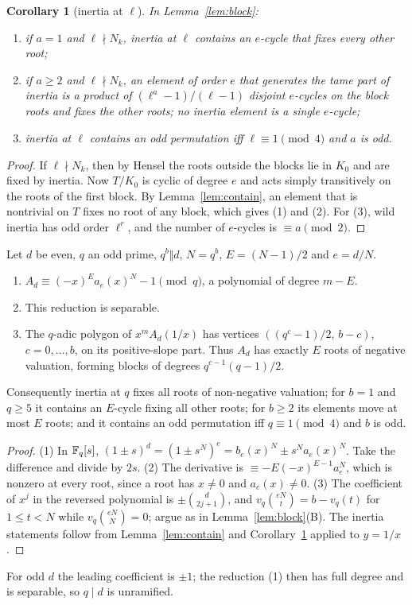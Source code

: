 \documentclass[11pt]{amsart}
\newtheorem{corollary}[theorem]{Corollary}\newtheorem{conjecture}[theorem]{Conjecture}
\theoremstyle{definition}\newtheorem{definition}[theorem]{Definition}\newtheorem{example}[theorem]{Example}
\theoremstyle{remark}\newtheorem{remark}[theorem]{Remark}
\begin{document}
\begin{corollary}[inertia at $\ell$]\label{cor:inertia}
In Lemma~\ref{lem:block}:
\begin{enumerate}
\item if $a=1$ and $\ell\nmid N_k$, inertia at $\ell$ contains an $e$-cycle that fixes every other root;
\item if $a\ge2$ and $\ell\nmid N_k$, an element of order $e$ that generates the tame part of inertia is a product of $(\ell^a-1)/(\ell-1)$ disjoint
$e$-cycles on the block roots and fixes the other roots; no inertia element is a single $e$-cycle;
\item inertia at $\ell$ contains an odd permutation iff $\ell\equiv1\pmod4$ and $a$ is odd.
\end{enumerate}
\end{corollary}
\begin{proof}
If $\ell\nmid N_k$, then by Hensel the roots outside the blocks lie in $K_0$ and are fixed by inertia. Now $T/K_0$ is cyclic of degree $e$ and
acts simply transitively on the roots of the first block. By Lemma~\ref{lem:contain}, an element that is nontrivial on $T$ fixes no root of any
block, which gives (1) and (2). For (3), wild inertia has odd order $\ell^r$, and the number of $e$-cycles is $\equiv a\pmod2$.
\end{proof}

\begin{lemma}\label{lem:dual}
Let $d$ be even, $q$ an odd prime, $q^b\Vert d$, $N=q^b$, $E=(N-1)/2$ and $e=d/N$.
\begin{enumerate}
\item $A_d\equiv(-x)^Ea_e(x)^N-1\pmod q$, a polynomial of degree $m-E$.
\item This reduction is separable.
\item The $q$-adic polygon of $x^mA_d(1/x)$ has vertices $((q^c-1)/2,\,b-c)$, $c=0,\dots,b$, on its positive-slope part. Thus $A_d$ has exactly
$E$ roots of negative valuation, forming blocks of degrees $q^{c-1}(q-1)/2$.
\end{enumerate}
Consequently inertia at $q$ fixes all roots of non-negative valuation; for $b=1$ and $q\ge5$ it contains an $E$-cycle fixing all other roots;
for $b\ge2$ its elements move at most $E$ roots; and it contains an odd permutation iff $q\equiv1\pmod4$ and $b$ is odd.
\end{lemma}
\begin{proof}
(1) In $\mathbb F_q[s]$, $(1\pm s)^d=(1\pm s^N)^e=b_e(x)^N\pm s^Na_e(x)^N$. Take the difference and divide by $2s$. (2) The derivative is
$\equiv-E(-x)^{E-1}a_e^N$, which is nonzero at every root, since a root has $x\ne0$ and $a_e(x)\ne0$. (3) The coefficient of $x^j$ in the
reversed polynomial is $\pm\binom d{2j+1}$, and $v_q\binom{eN}t=b-v_q(t)$ for $1\le t<N$ while $v_q\binom{eN}N=0$; argue as in
Lemma~\ref{lem:block}(B). The inertia statements follow from Lemma~\ref{lem:contain} and Corollary~\ref{cor:inertia} applied to $y=1/x$.
\end{proof}
For odd $d$ the leading coefficient is $\pm1$; the reduction (1) then has full degree and is separable, so $q\mid d$ is unramified.
\end{document}
